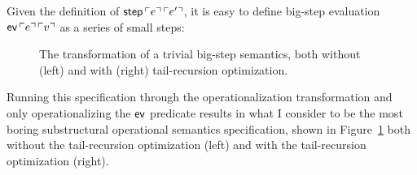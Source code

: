 Given the definition of ${\sf step}\,{\ulcorner{e}\urcorner}\,{\ulcorner{e'}\urcorner}$, it is
easy to define big-step evaluation ${\sf ev}\,{\ulcorner{e}\urcorner}\,{\ulcorner{v}\urcorner}$
as a series of small steps:

\smallskip
{}
\smallskip

\begin{figure}
\begin{minipage}[b]{0.55\linewidth}
\end{minipage}
\hspace{0.5cm}
\begin{minipage}[b]{0.45\linewidth}
\end{minipage}
\caption{The transformation of a trivial big-step semantics, both
  without (left) and with (right) tail-recursion optimization.}
\label{fig:sos-tailrecursion}
\end{figure}

Running this specification through the operationalization
transformation and only operationalizing the ${\sf ev}$ predicate
results in what I consider to be the most boring substructural
operational semantics specification, shown in
Figure~\ref{fig:sos-tailrecursion} both without the tail-recursion
optimization (left) and with the tail-recursion optimization (right).

